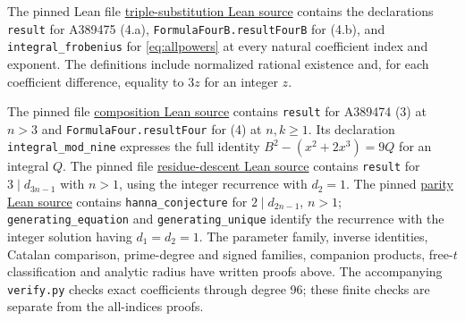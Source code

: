 \documentclass[11pt]{article}
\begin{document}
\medskip
The pinned Lean file
\href{https://github.com/the-omega-institute/trureturing/blob/074df09ddbbef1843ddb383577bfaa827f753e36/D5/S1/Recurrence/Invariants/HannaTripleSquareFrobeniusModThree.lean}{triple-substitution Lean source}
contains the declarations \texttt{result} for A389475 (4.a),
\texttt{FormulaFourB.resultFourB} for (4.b), and
\texttt{integral\_frobenius} for \eqref{eq:allpowers} at every
natural coefficient index and exponent.
The definitions include normalized rational existence and, for each
coefficient difference, equality to $3z$ for an integer $z$.

The pinned file
\href{https://github.com/the-omega-institute/trureturing/blob/074df09ddbbef1843ddb383577bfaa827f753e36/D5/S1/Recurrence/Invariants/HannaCompositionSquareModNine.lean}{composition Lean source}
contains \texttt{result} for A389474 (3) at $n>3$ and
\texttt{FormulaFour.resultFour} for (4) at $n,k\geq1$.
Its declaration \texttt{integral\_mod\_nine} expresses the full
identity $B^2-(x^2+2x^3)=9Q$ for an integral $Q$.
The pinned file
\href{https://github.com/the-omega-institute/trureturing/blob/074df09ddbbef1843ddb383577bfaa827f753e36/D5/S1/Recurrence/Parity/SquareCubeSubstitutionThreeIndexModThree.lean}{residue-descent Lean source}
contains \texttt{result} for $3\mid d_{3n-1}$ with $n>1$, using the
integer recurrence with $d_2=1$.
The pinned
\href{https://github.com/the-omega-institute/trureturing/blob/074df09ddbbef1843ddb383577bfaa827f753e36/D5/S1/Recurrence/Parity/SquareCubeSubstitutionOddIndexParity.lean}{parity Lean source}
contains \texttt{hanna\_conjecture} for $2\mid d_{2n-1}$, $n>1$;
\texttt{generating\_equation} and \texttt{generating\_unique} identify the
recurrence with the integer solution having $d_1=d_2=1$.
The parameter family, inverse identities, Catalan comparison,
prime-degree and signed families, companion products, free-$t$
classification and analytic radius
have written proofs above. The accompanying \texttt{verify.py}
checks exact coefficients through degree 96; these finite checks are
separate from the all-indices proofs.
\end{document}
